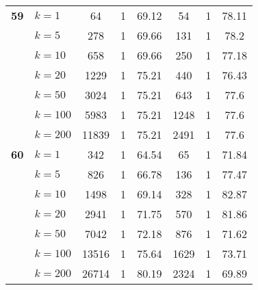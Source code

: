 \begin{table}[htbp]
\begin{tabular}{|l|l|c|c|c|c|c|c|}
    \multicolumn{1}{|r|}{\textbf{59}} & $k=1$ & 64 & 1 & 69.12 & 54 & 1 & 78.11 \\ 
     & $k=5$ & 278 & 1 & 69.66 & 131 & 1 & 78.2 \\ 
     & $k=10$ & 658 & 1 & 69.66 & 250 & 1 & 77.18 \\ 
     & $k=20$ & 1229 & 1 & 75.21 & 440 & 1 & 76.43 \\ 
     & $k=50$ & 3024 & 1 & 75.21 & 643 & 1 & 77.6 \\ 
     & $k=100$ & 5983 & 1 & 75.21 & 1248 & 1 & 77.6 \\ 
     & $k=200$ & 11839 & 1 & 75.21 & 2491 & 1 & 77.6 \\ \hline
    \multicolumn{1}{|r|}{\textbf{60}} & $k=1$ & 342 & 1 & 64.54 & 65 & 1 & 71.84 \\ 
     & $k=5$ & 826 & 1 & 66.78 & 136 & 1 & 77.47 \\ 
     & $k=10$ & 1498 & 1 & 69.14 & 328 & 1 & 82.87 \\ 
     & $k=20$ & 2941 & 1 & 71.75 & 570 & 1 & 81.86 \\ 
     & $k=50$ & 7042 & 1 & 72.18 & 876 & 1 & 71.62 \\ 
     & $k=100$ & 13516 & 1 & 75.64 & 1629 & 1 & 73.71 \\ 
     & $k=200$ & 26714 & 1 & 80.19 & 2324 & 1 & 69.89 \\ \hline
    \end{tabular}
\end{table}
